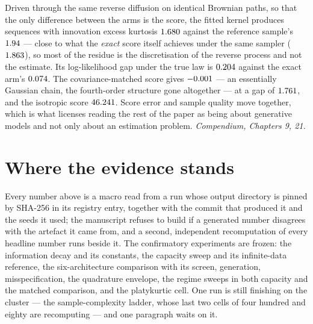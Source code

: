 \documentclass[11pt,a4paper]{article}
\newcommand{\comp}[1]{{\small\textit{Compendium, #1.}}}
\begin{document}
\noindent
Driven through the same reverse diffusion on identical Brownian paths, so that the only difference
between the arms is the score, the fitted kernel produces sequences with innovation excess kurtosis
$1.680$ against the reference sample's $1.94$ --- close to what the \emph{exact}
score itself achieves under the same sampler ($1.863$), so most of the residue is the
discretisation of the reverse process and not the estimate. Its log-likelihood gap under the true
law is $0.204$ against the exact arm's $0.074$. The covariance-matched
score gives $-0.001$ --- an essentially Gaussian chain, the fourth-order structure gone
altogether --- at a gap of $1.761$, and the isotropic score $46.241$.
Score error and sample quality move together, which is what licenses reading the rest of the paper
as being about generative models and not only about an estimation problem.
\comp{Chapters 9, 21}

\section{Where the evidence stands}

Every number above is a macro read from a run whose output directory is pinned by SHA-256 in its
registry entry, together with the commit that produced it and the seeds it used; the manuscript
refuses to build if a generated number disagrees with the artefact it came from, and a second,
independent recomputation of every headline number runs beside it. The confirmatory experiments
are frozen: the information decay and its constants, the capacity sweep and its infinite-data
reference, the six-architecture comparison with its screen, generation, misspecification, the
quadrature envelope, the regime sweeps in both capacity and the matched comparison, and the
platykurtic cell. One run is still finishing on the cluster --- the sample-complexity ladder, whose
last two cells of four hundred and eighty are recomputing --- and one paragraph waits on it.
\end{document}
